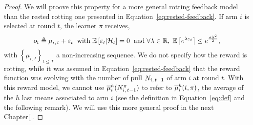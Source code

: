 \begin{proof}
We will proove this property for a more general rotting feedback model than the rested rotting one presented in Equation~\ref{eq:rested-feedback}. If arm $i$ is selected at round $t$, the learner $\pi$ receives,
\[
o_t \triangleq \mu_{i, \, t} + \varepsilon_t  \;\; \text{with}\; \mathbb{E}\left[ \varepsilon_t | \mathcal{H}_t \right]= 0 \;\; \text{and} \; \forall \lambda \in \mathbb{R}, \; \mathbb{E}\left[ e^{\lambda\varepsilon_t}\right] \leq e^{\frac{\sigma\lambda^2}{2}},
\]
with $\left\{ \mu_{i, \, t}\right\}_{t\leq T}$ a non-increasing sequence. We do not specify how the reward is rotting, while it was assumed in Equation~\ref{eq:rested-feedback} that the reward function was evolving with the number of pull $N_{i,\,t-1}$ of arm $i$ at round $t$. With this reward model, we cannot use $\overline{\mu}^{h}_{i}(N_{i,\,t-1}^{\pi})$ to refer to $\overline{\mu}_i^h(t,\pi)$, the average of the $h$ last means associated to arm $i$ (see the definition in Equation~\ref{eq:def} and the following remark). We will use this more general proof in the next Chapter\ref{}. %


\end{proof}
